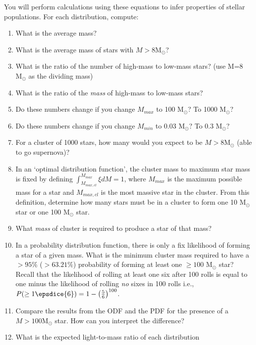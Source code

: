 \documentclass[twoside]{tufte-book} %
\newcommand{\msun}{\ensuremath{\mathrm{M}_\odot}\xspace}
\begin{document}
\begin{enumerate}
    You will perform calculations using these equations to infer properties of stellar
    populations.  For each distribution, compute:
    \begin{enumerate}
        \item What is the average mass?
        \item What is the average mass of stars with $M>8\msun$?
        \item What is the ratio of the number of high-mass to low-mass stars?
            (use M=8 \msun as the dividing mass)
        \item What is the ratio of the \emph{mass} of high-mass to low-mass stars?
        \item Do these numbers change if you change $M_{max}$ to 100 \msun?  To 1000 \msun?
        \item Do these numbers change if you change $M_{min}$ to 0.03 \msun?  To 0.3 \msun?
        \item For a cluster of 1000 stars, how many would you expect to be
            $M>8\msun$ (able to go supernova)?
        \item In an `optimal distribution function', the cluster mass to maximum star mass
            is fixed by defining $\int_{M_{max,cl}}^{M_{max}} \xi dM = 1$,
            where $M_{max}$ is the maximum possible mass for a star and $M_{max,cl}$ is
            the most massive star in the cluster.
            From this definition, determine how many stars must be in a cluster
            to form one 10 \msun star or one 100 \msun star.
        \item What \emph{mass} of cluster is required to produce a star of that mass?
        \item In a probability distribution function, there is only a fix likelihood
            of forming a star of a given mass.  What is the minimum cluster mass
            required to have a $>95\%$ ($>63.21\%$) probability of forming at least one $\geq100$
            \msun star?\\
            Recall that the likelihood of rolling at least one six after 100 rolls
            is equal to one minus the likelihood of rolling \emph{no} sixes in 100 rolls
            i.e., $P(\ge 1 \epsdice{6}) = 1- \left(\frac{5}{6}\right)^{100}$.
        \item Compare the results from the ODF and the PDF for the presence of
            a $M>100\msun$ star.  How can you interpret the difference?
        \item What is the expected light-to-mass ratio of each distribution

\end{enumerate}
\end{enumerate}
\end{document}
